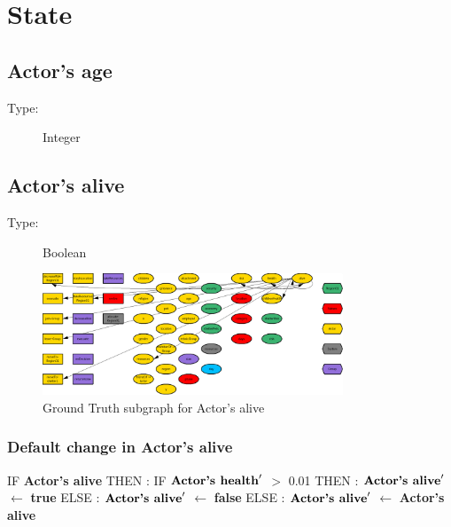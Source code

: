 \documentclass{article}%
\begin{document}
%
\section{State}%
\label{sec:State}%
\subsection{Actor's age}%
\label{subsec:Actor's age}%
\begin{description}%
\item[Type:]%
Integer%
\end{description}

%
\subsection{Actor's alive}%
\label{subsec:Actor's alive}%
\begin{description}%
\item[Type:]%
Boolean%
\end{description}%


\begin{figure}[ht]%
\centering%
\includegraphics[width=0.8\textwidth]{images/aliveOfActor.png}%
\caption{Ground Truth subgraph for Actor's alive}%
\end{figure}

%
\subsubsection{Default change in Actor's alive}%
\label{ssubsec:Default change in Actor's alive}%
\begin{flushleft}%
IF %
\textbf{Actor's alive}%
\linebreak%
\hspace*{2em}%
THEN %
: %
IF %
$\mbox{\textbf{Actor's health}} '$%
$>$%
0.01%
\linebreak%
\hspace*{4em}%
THEN %
: %
$\mbox{\textbf{Actor's alive}} '$%
$\leftarrow$%
\textbf{true}%
\linebreak%
\hspace*{4em}%
ELSE %
: %
$\mbox{\textbf{Actor's alive}} '$%
$\leftarrow$%
\textbf{false}%
\linebreak%
\hspace*{2em}%
ELSE %
: %
$\mbox{\textbf{Actor's alive}} '$%
$\leftarrow$%
\textbf{Actor's alive}%
\end{flushleft}
\end{document}
